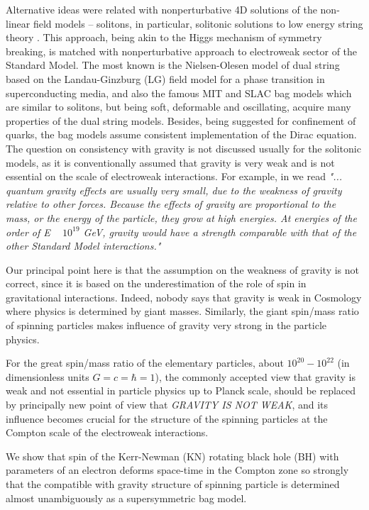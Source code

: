 \documentclass[aps,prd,twocolumn,showpacs]{revtex4}
\begin{document}
Alternative ideas were related with nonperturbative 4D solutions of the non-linear field models --
solitons, in particular, solitonic solutions to low energy string theory \cite{Dabh,Sen,BurSen}.
This approach, being akin to the Higgs mechanism of symmetry breaking, is matched with
nonperturbative approach to electroweak sector of the Standard Model. The most known is the
Nielsen-Olesen model of dual string based on the Landau-Ginzburg (LG) field model for a phase
transition in superconducting media, and also the famous MIT and SLAC bag models
\cite{MIT,SLAC,Dash}  which are similar to solitons, but being soft, deformable and oscillating,
acquire many properties of the dual string models. Besides, being suggested for confinement of
quarks, the bag models assume consistent implementation of the Dirac equation. The question on
consistency with gravity is not discussed usually for the solitonic models, as it is conventionally
assumed that gravity is very weak and is not essential on the scale of electroweak interactions.
For example, in \cite{Malda} we read \emph{"... quantum gravity effects are usually very
small, due to the weakness of gravity relative to other forces. Because the effects
of gravity are proportional to the mass, or the energy of the particle, they grow
at high energies. At energies of the order of E ~ $10^{19} $ GeV, gravity would have a
strength comparable with that of the other Standard Model interactions."}

 Our principal point here is that the assumption on the weakness of gravity is not correct, since it is
 based on the underestimation of the role of spin in gravitational interactions.
 Indeed, nobody says that gravity is weak in Cosmology where physics is determined by giant masses.
Similarly, the giant spin/mass ratio of spinning particles makes influence of gravity very strong
in the particle physics.

 For the great spin/mass ratio of the elementary particles, about $ 10^{20}- 10^{22} $   (in dimensionless units $G=c=\hbar =1 $), the commonly accepted view that gravity is weak and not essential in particle physics up to Planck
scale, should be replaced by principally new point of view that \emph{GRAVITY IS NOT WEAK}, and its
influence becomes crucial for the structure of the spinning particles at the Compton scale of the
electroweak interactions.

 We show that spin of the Kerr-Newman (KN) rotating black hole (BH) with parameters of an
electron deforms space-time in the Compton zone so strongly that the compatible with gravity structure of spinning particle
is determined almost unambiguously as a supersymmetric bag model.
\end{document}
